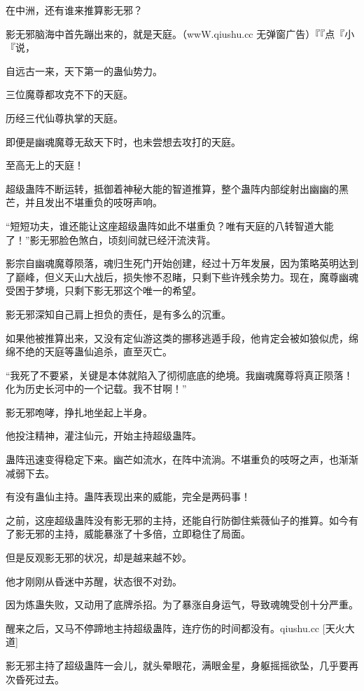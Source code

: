 
\begin{this_body}

在中洲，还有谁来推算影无邪？

影无邪脑海中首先蹦出来的，就是天庭。（wwW.qiushu.cc 无弹窗广告）『『点『小『说，

自远古一来，天下第一的蛊仙势力。

三位魔尊都攻克不下的天庭。

历经三代仙尊执掌的天庭。

即便是幽魂魔尊无敌天下时，也未尝想去攻打的天庭。

至高无上的天庭！

超级蛊阵不断运转，抵御着神秘大能的智道推算，整个蛊阵内部绽射出幽幽的黑芒，并且发出不堪重负的吱呀声响。

“短短功夫，谁还能让这座超级蛊阵如此不堪重负？唯有天庭的八转智道大能了！”影无邪脸色煞白，顷刻间就已经汗流浃背。

影宗自幽魂魔尊陨落，魂归生死门开始创建，经过十万年发展，因为策略英明达到了巅峰，但义天山大战后，损失惨不忍睹，只剩下些许残余势力。现在，魔尊幽魂受困于梦境，只剩下影无邪这个唯一的希望。

影无邪深知自己肩上担负的责任，是有多么的沉重。

如果他被推算出来，又没有定仙游这类的挪移逃遁手段，他肯定会被如狼似虎，绵绵不绝的天庭等蛊仙追杀，直至灭亡。

“我死了不要紧，关键是本体就陷入了彻彻底底的绝境。我幽魂魔尊将真正陨落！化为历史长河中的一个记载。我不甘啊！”

影无邪咆哮，挣扎地坐起上半身。

他投注精神，灌注仙元，开始主持超级蛊阵。

蛊阵迅速变得稳定下来。幽芒如流水，在阵中流淌。不堪重负的吱呀之声，也渐渐减弱下去。

有没有蛊仙主持。蛊阵表现出来的威能，完全是两码事！

之前，这座超级蛊阵没有影无邪的主持，还能自行防御住紫薇仙子的推算。如今有了影无邪的主持，威能暴涨了十多倍，立即稳住了局面。

但是反观影无邪的状况，却是越来越不妙。

他才刚刚从昏迷中苏醒，状态很不对劲。

因为炼蛊失败，又动用了底牌杀招。为了暴涨自身运气，导致魂魄受创十分严重。

醒来之后，又马不停蹄地主持超级蛊阵，连疗伤的时间都没有。qiushu.cc [天火大道]

影无邪主持了超级蛊阵一会儿，就头晕眼花，满眼金星，身躯摇摇欲坠，几乎要再次昏死过去。


\end{this_body}
